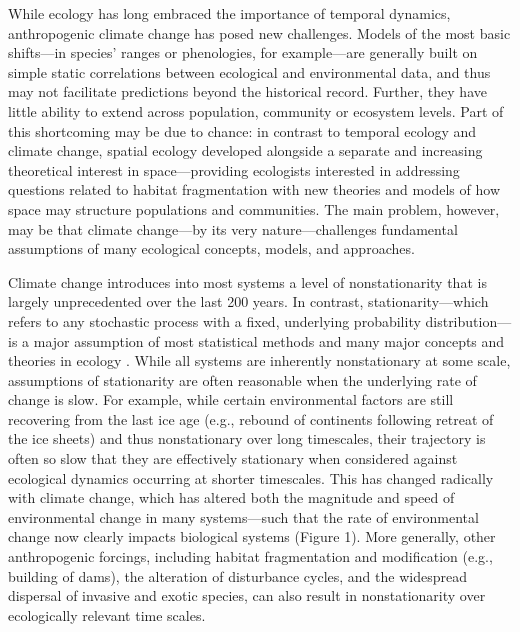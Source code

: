 \documentclass[11pt,a4paper,oneside]{article}
\begin{document}
\noindent While ecology has long embraced the importance of temporal dynamics, anthropogenic climate change has posed new challenges. Models of the most basic shifts---in species' ranges or phenologies, for example---are generally built on simple static correlations between ecological and environmental data, and thus may not facilitate predictions beyond the historical record. Further, they have little ability to extend across population, community or ecosystem levels. Part of this shortcoming may be due to chance: in contrast to temporal ecology and climate change, spatial ecology developed alongside a separate and increasing theoretical interest in space---providing ecologists interested in addressing questions related to habitat fragmentation with new theories and models of how space may structure populations and communities. The main problem, however, may be that climate change---by its very nature---challenges fundamental assumptions of many ecological concepts, models, and approaches. 

Climate change introduces into most systems a level of nonstationarity that is largely unprecedented over the last 200 years. In contrast, stationarity---which refers to any stochastic process with a fixed, underlying probability distribution---is a major assumption of most statistical methods and many major concepts and theories in ecology \citep{julio2012}. While all systems are inherently nonstationary at some scale, assumptions of stationarity are often reasonable when the underlying rate of change is slow. For example, while certain environmental factors are still recovering from the last ice age (e.g., rebound of continents following retreat of the ice sheets) and thus nonstationary over long timescales, their trajectory is often so slow that they are effectively stationary when considered against ecological dynamics occurring at shorter timescales. This has changed radically with climate change, which has altered both the magnitude and speed of environmental change in many systems---such that the rate of environmental change now clearly impacts biological systems (Figure 1). More generally, other anthropogenic forcings, including habitat fragmentation and modification (e.g., building of dams), the alteration of disturbance cycles, and the widespread dispersal of invasive and exotic species, can also result in nonstationarity over ecologically relevant time scales.
\end{document}

